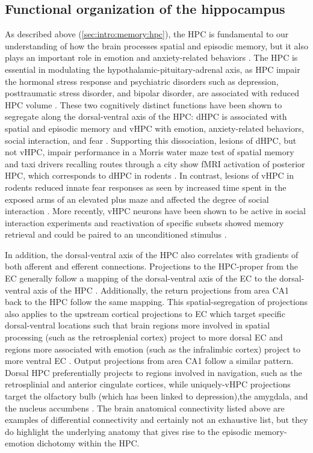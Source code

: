 \subsection{Functional organization of the hippocampus}
As described above (\autoref{sec:intro:memory:hpc}), the \ac{HPC} is fundamental to our understanding of how the brain processes spatial and episodic memory, but it also plays an important role in emotion and anxiety-related behaviors \citep{Fanselow2010}.
The \ac{HPC} is essential in modulating the hypothalamic-pituitary-adrenal axis, as \ac{HPC} impair the hormonal stress response \citep{Jacobson1991} and psychiatric disorders such as depression, posttraumatic stress disorder, and bipolar disorder, are associated with reduced \ac{HPC} volume \citep{Fanselow2010}.
These two cognitively distinct functions have been shown to segregate along the dorsal-ventral axis of the \ac{HPC}: \ac{dHPC} is associated with spatial and episodic memory and \ac{vHPC} with emotion, anxiety-related behaviors, social interaction, and fear \citep{Moser1998, Fanselow2010, Strange2014}.
Supporting this dissociation, lesions of \ac{dHPC}, but not \ac{vHPC}, impair performance in a Morris water maze test of spatial memory \citep{Moser1995} and taxi drivers recalling routes through a city show \ac{fMRI} activation of posterior \ac{HPC}, which corresponds to \ac{dHPC} in rodents \citep{Maguire1997}.
In contrast, lesions of \ac{vHPC} in rodents reduced innate fear responses as seen by increased time spent in the exposed arms of an elevated plus maze and affected the degree of social interaction \citep{Fanselow2010, Strange2014}.
More recently, \ac{vHPC} neurons have been shown to be active in social interaction experiments and reactivation of specific subsets showed memory retrieval and could be paired to an unconditioned stimulus \citep{Okuyama2016}.

In addition, the dorsal-ventral axis of the \ac{HPC} also correlates with gradients of both afferent and efferent connections.
Projections to the \ac{HPC}-proper from the \ac{EC} generally follow a mapping of the dorsal-ventral axis of the \ac{EC} to the dorsal-ventral axis of the \ac{HPC} \citep{Strange2014}.
Additionally, the return projections from area CA1 back to the \ac{HPC} follow the same mapping.
This spatial-segregation of projections also applies to the upstream cortical projections to \ac{EC} which target specific dorsal-ventral locations such that brain regions more involved in spatial processing (such as the retrosplenial cortex) project to more dorsal \ac{EC} and regions more associated with emotion (such as the infralimbic cortex) project to more ventral \ac{EC} \citep{Strange2014}.
Output projections from area CA1 follow a similar pattern.
Dorsal \ac{HPC} preferentially projects to regions involved in navigation, such as the retrosplinial and anterior cingulate cortices, while uniquely-\ac{vHPC} projections target the olfactory bulb (which has been linked to depression),the amygdala, and the nucleus accumbens \citep{Moser1998, Fanselow2010, Strange2014}.
The brain anatomical connectivity listed above are examples of differential connectivity and certainly not an exhaustive list, but they do highlight the underlying anatomy that gives rise to the episodic memory-emotion dichotomy within the \ac{HPC}.

